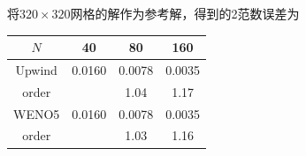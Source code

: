 \documentclass[a4paper,  11pt]{ctexart}
\begin{document}
\begin{figure}[H]
\end{figure}
将$320\times 320$网格的解作为参考解，得到的2范数误差为
\begin{table}[H]
  \centering
  \begin{tabular}{cccc}
    $N$ & 40 & 80 & 160 \\
    \hline
    Upwind &0.0160&0.0078&0.0035 \\
    order& & 1.04 &1.17 \\
    WENO5 & 0.0160 &0.0078&0.0035 \\
    order& & 1.03&1.16 \\
  \end{tabular}
\end{table}
\end{document}
